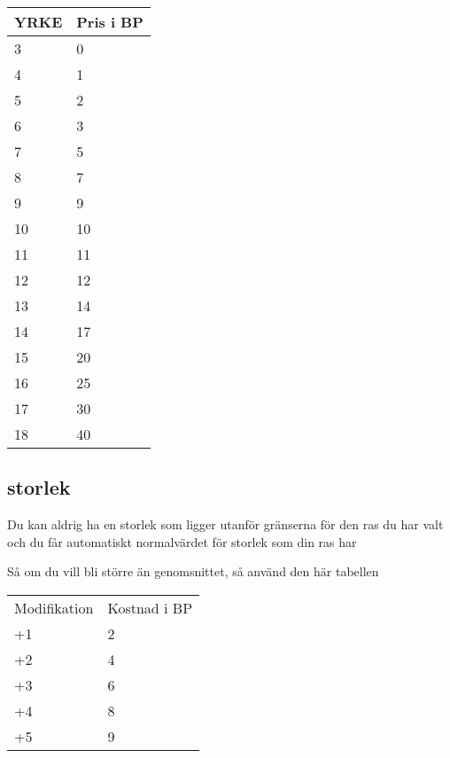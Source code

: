 \documentclass[a4paper, 10pt, titlepage]{article}
\begin{document}
\begin{table}[hbp]
  \begin{tabular}{|l|l|}
    \hline
    YRKE & Pris i BP \\
    \hline
    3    & 0 \\
    \hline
    4    & 1 \\
    \hline
    5    & 2 \\
    \hline
    6    & 3 \\
    \hline
    7    & 5 \\
    \hline
    8    & 7 \\
    \hline
    9    & 9 \\
    \hline
    10   & 10 \\
    \hline
    11   & 11 \\
    \hline
    12   & 12 \\
    \hline
    13   & 14 \\
    \hline
    14   & 17 \\
    \hline
    15   & 20 \\
    \hline
    16   & 25 \\
    \hline
    17   & 30 \\
    \hline
    18   & 40 \\
    \hline
  \end{tabular}
\end{table}

\subsection{storlek}
Du kan aldrig ha en storlek som ligger utanför gränserna för den ras du har valt och
du får automatiskt normalvärdet för storlek som din ras har

Så om du vill bli större än genomsnittet, så använd den här tabellen
\begin{table}[hbp]
  \begin{tabular}{|l|l|}
    Modifikation & Kostnad i BP \\
    +1           & 2            \\
    \hline
    +2           & 4            \\
    \hline
    +3           & 6            \\
    \hline
    +4           & 8            \\
    \hline
    +5           & 9            \\
    \hline
  \end{tabular}
\end{table}
\end{document}
